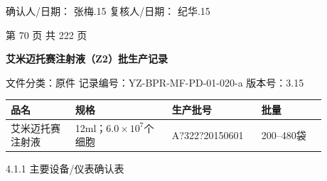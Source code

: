 \documentclass[UTF8,10pt,a4paper,fontset=fandol]{ctexart}
\newcommand{\fieldvalue}[1]{#1}
\newcommand{\handwritten}[1]{#1}
\begin{document}
\noindent
确认人/日期：
\fieldvalue{\handwritten{张梅.15}}
\hfill
复核人/日期：
\fieldvalue{\handwritten{纪华.15}}

\vfill

\begin{center}
第 70 页 共 222 页
\end{center}

\newpage

\begin{center}
\textbf{艾米迈托赛注射液（Z2）批生产记录}
\end{center}

\noindent
文件分类：原件\hfill
记录编号：YZ-BPR-MF-PD-01-020-a\hfill
版本号：3.15

\smallskip

\begin{tabular}{|p{0.18\linewidth}|p{0.27\linewidth}|p{0.25\linewidth}|p{0.18\linewidth}|}
\hline
品名 & 规格 & 生产批号 & 批量\\
\hline
艾米迈托赛注射液 & 12ml；$6.0\times10^{7}$个细胞 &
\fieldvalue{\handwritten{A?322?20150601}} &
200--480袋\\
\hline
\end{tabular}

\medskip

4.1.1 主要设备/仪表确认表

\smallskip
\end{document}
